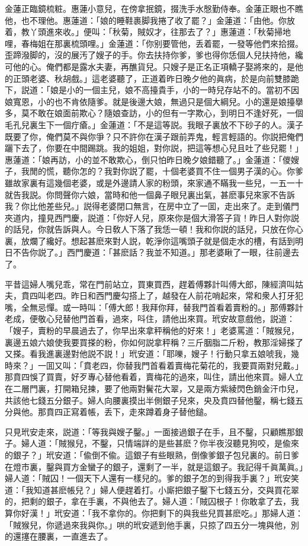 金蓮正臨鏡梳粧。惠蓮小意兒，在傍拿抿鏡，掇洗手水慇勤侍奉。金蓮正眼也不瞧他，也不理他。惠蓮道：「娘的睡鞋裹脚我捲了收了罷？」金蓮道：「由他。你放着，教丫頭進來收。」便叫：「秋菊，賊奴才，往那去了？」惠蓮道：「秋菊掃地哩，春梅姐在那裏梳頭哩。」金蓮道：「你别要管他，丢着罷，一發等他們來拾掇。歪蹄潑脚的，沒的展汚了嫂子的手。你去扶持你爹，爹也得你恁個人兒扶持他，纔可他的心。俺們都是露水夫妻，再醮貨兒。只嫂子是正名正項轎子娶將來的，是他的正頭老婆、秋胡戲。」這老婆聽了，正道着昨日晚夕他的眞病，於是向前雙膝跪下，説道：「娘是小的一個主兒，娘不高擡貴手，小的一時兒存站不的。當初不因娘寬恩，小的也不肯依隨爹。就是後邊大娘，無過只是個大綱兒。小的還是娘擡擧多，莫不敢在娘面前欺心？隨娘查訪，小的但有一字欺心，到明日不逢好死，一個毛孔兒裏生下一個疔瘡。」金蓮道：「不是這等説。我眼子裏放不下砂子的人。漢子既要了你，俺們莫不與你爭？只不許你在漢子跟前弄鬼，輕言輕語的。你説把俺們躧下去了，你要在中間踢跳。我的姐姐，對你説，把這等想心兒且吐了些兒罷！」惠蓮道：「娘再訪，小的並不敢欺心，倒只怕昨日晚夕娘錯聽了。」金蓮道：「儍嫂子，我閒的慌，聽你怎的？我對你説了罷，十個老婆買不住一個男子漢的心。你爹雖故家裏有這幾個老婆，或是外邊請人家的粉頭，來家通不瞞我一些兒，一五一十就告我説。你問聲你六娘，當時和他一個鼻子眼兒裏出氣，甚麽事兒來家不告訴我？你比他差些兒。」説得老婆閉口無言，在房中立了一囬，走出來了。走到儀門夾道内，撞見西門慶，説道：「你好人兒，原來你是個大滑答子貨！昨日人對你説的話兒，你就告訴與人。今日敎人下落了我恁一頓！我和你説的話兒，只放在你心裏，放爛了纔好。想起甚麽來對人説，乾淨你這嘴頭子就是個走水的槽，有話到明日不告你説了。」西門慶道：「甚麽話？我並不知道。」那老婆瞅了一眼，往前邊去了。

平昔這婦人嘴兒乖，常在門前站立，買東買西，趕着傅夥計叫傅大郎，陳經濟叫姑夫，賁四叫老四。昨日和西門慶勾搭上了，越發在人前花哨起來，常和衆人打牙犯嘴，全無忌憚。或一時叫：「傅大郎！我拜你拜，替我門首看着賣粉的。」那傅夥計老成，便敬心兒替他門首看，過來，呌住，請他出來買。玳安故意戲他，説道：「嫂子，賣粉的早晨過去了，你早出來拿秤稱他的好來！」老婆罵道：「賊猴兒，裏邊五娘六娘使我要買搽的粉，你如何説拿秤稱？三斤胭脂二斤粉，教那淫婦搽了又搽。看我進裏邊對他説不説！」玳安道：「耶嚛，嫂子！行動只拿五娘唬我，幾時來？」一囬又叫：「賁老四，你替我門首看着賣梅花菊花的，我要買兩對兒戴。」那賁四悞了買賣，好歹專心替他看着，賣梅花的過來，叫住，請出他來買。婦人立在二層門裏，打開箱兒揀，要了他兩對鬢花大翠，又是兩方紫綾閃色銷金汗巾兒，共該他七錢五分銀子。婦人向腰裏摸出半側銀子兒來，央及賁四替他鑿，稱七錢五分與他。那賁四正寫着帳，丢下，走來蹲着身子替他鎚。

只見玳安走來，説道：「等我與嫂子鑿。」一面接過銀子在手，且不鑿，只顧瞧那銀子。婦人道：「賊猴兒，不鑿，只情端詳的是些甚麽？你半夜沒聽見狗咬，是偸來的銀子？」玳安道：「偸倒不偸。這銀子有些眼熟，倒像爹銀子包兒裏的。前日爹在燈市裏，鑿與買方金蠻子的銀子，還剩了一半，就是這銀子。我記得千眞萬眞。」婦人道：「賊囚！一個天下人還有一樣兒的。爹的銀子怎的到得我手裏？」玳安笑道：「我知道甚麽帳兒？」婦人便趕着打。小廝把銀子鑿下七錢五分，交與買花翠的，把剩的銀子，拿在手裏，不與他去了。婦人道：「賊囚根子！你敢拿了去，我算你好漢！」玳安道：「我不拿你的。你把剩下的與我些兒買甚麽吃。」那婦人道：「賊猴兒，你遞過來我與你。」哄的玳安遞到他手裏，只掠了四五分一塊與他，別的還㩙在腰裏，一直進去了。

